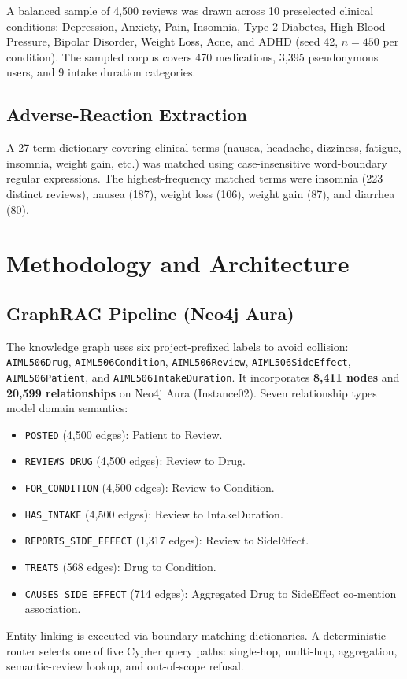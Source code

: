 \documentclass[conference]{IEEEtran}
\begin{document}
A balanced sample of 4,500 reviews was drawn across 10 preselected clinical conditions: Depression, Anxiety, Pain, Insomnia, Type 2 Diabetes, High Blood Pressure, Bipolar Disorder, Weight Loss, Acne, and ADHD (seed 42, $n=450$ per condition). The sampled corpus covers 470 medications, 3,395 pseudonymous users, and 9 intake duration categories.

\subsection{Adverse-Reaction Extraction}
A 27-term dictionary covering clinical terms (nausea, headache, dizziness, fatigue, insomnia, weight gain, etc.) was matched using case-insensitive word-boundary regular expressions. The highest-frequency matched terms were insomnia (223 distinct reviews), nausea (187), weight loss (106), weight gain (87), and diarrhea (80).

\section{Methodology and Architecture}
\subsection{GraphRAG Pipeline (Neo4j Aura)}
The knowledge graph uses six project-prefixed labels to avoid collision: \texttt{AIML506Drug}, \texttt{AIML506Condition}, \texttt{AIML506Review}, \texttt{AIML506SideEffect}, \texttt{AIML506Patient}, and \texttt{AIML506IntakeDuration}. It incorporates \textbf{8,411 nodes} and \textbf{20,599 relationships} on Neo4j Aura (Instance02). Seven relationship types model domain semantics:
\begin{itemize}
    \item \texttt{POSTED} (4,500 edges): Patient to Review.
    \item \texttt{REVIEWS\_DRUG} (4,500 edges): Review to Drug.
    \item \texttt{FOR\_CONDITION} (4,500 edges): Review to Condition.
    \item \texttt{HAS\_INTAKE} (4,500 edges): Review to IntakeDuration.
    \item \texttt{REPORTS\_SIDE\_EFFECT} (1,317 edges): Review to SideEffect.
    \item \texttt{TREATS} (568 edges): Drug to Condition.
    \item \texttt{CAUSES\_SIDE\_EFFECT} (714 edges): Aggregated Drug to SideEffect co-mention association.
\end{itemize}
Entity linking is executed via boundary-matching dictionaries. A deterministic router selects one of five Cypher query paths: single-hop, multi-hop, aggregation, semantic-review lookup, and out-of-scope refusal.
\end{document}

